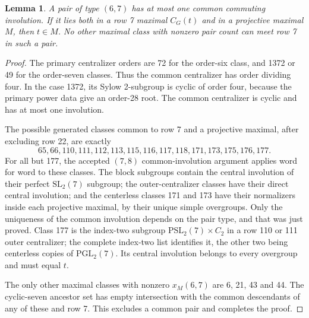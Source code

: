 \documentclass[11pt,a4paper]{article}
\newtheorem{lemma}{Lemma}\newtheorem{theorem}{Theorem}
\begin{document}
\begin{lemma}\label{common}
A pair of type $(6,7)$ has at most one common commuting involution.
If it lies both in a row 7 maximal $C_G(t)$ and in a projective
maximal $M$, then $t\in M$. No other maximal class with nonzero
pair count can meet row 7 in such a pair.
\end{lemma}
\begin{proof}
The primary centralizer orders are 72 for the order-six class, and
1372 or 49 for the order-seven classes. Thus the common centralizer
has order dividing four. In the case 1372, its Sylow 2-subgroup is
cyclic of order four, because the primary power data give an
order-28 root. The common centralizer is cyclic and has at most
one involution.

The possible generated classes common to row 7 and a projective
maximal, after excluding row 22, are exactly
\[
65,66,110,111,112,113,115,116,117,118,171,173,175,176,177.
\]
For all but 177, the accepted $(7,8)$ common-involution argument
applies word for word to these classes. The block subgroups contain
the central involution of their perfect $\mathrm{SL}_2(7)$ subgroup;
the outer-centralizer classes have their direct central involution;
and the centerless classes 171 and 173 have their normalizers inside
each projective maximal, by their unique simple overgroups.
Only the uniqueness of the common involution depends on the pair
type, and that was just proved. Class 177 is the index-two subgroup
$\mathrm{PSL}_2(7)\times C_2$ in a row 110 or 111 outer centralizer;
the complete index-two list identifies it, the other two being
centerless copies of $\mathrm{PGL}_2(7)$. Its central involution
belongs to every overgroup and must equal $t$.

The only other maximal classes with nonzero $x_M(6,7)$ are 6, 21,
43 and 44. The cyclic-seven ancestor set has empty intersection
with the common descendants of any of these and row 7. This
excludes a common pair and completes the proof.
\end{proof}
\end{document}
